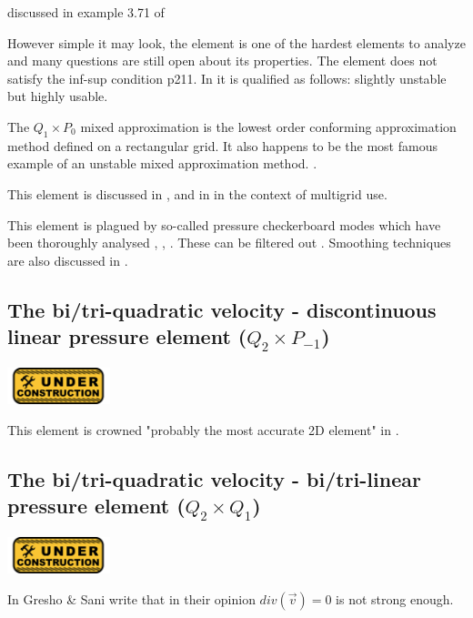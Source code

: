 discussed in example 3.71 of \cite{john16}

However simple it may look, the  element is 
one of the hardest elements to analyze and many questions are still open about its properties. 
The element does not satisfy the inf-sup condition \cite{hugh}p211. 
In \cite{grsa} it is qualified as follows: slightly unstable but highly usable. 

The $Q_1 \times P_0$ mixed approximation is the lowest order conforming approximation 
method defined on a rectangular grid. It also happens to be the most famous example 
of an unstable mixed approximation method.
\cite[p235]{elsw}.

This element is discussed in \cite{fort81}, \cite{fofo85} and in \cite{pisa85} 
in the context of multigrid use.

This element is plagued by so-called pressure checkerboard modes which
have been thoroughly analysed \cite{grsi94}, \cite{chpc95}, \cite{sagl81a,sagl81b}.
These can be filtered out \cite{chpc95}. Smoothing techniques are also discussed in \cite{legs79}.





\subsection{The bi/tri-quadratic velocity - discontinuous linear pressure element ($Q_2 \times P_{-1}$)}
\includegraphics[width=3cm]{images/under_construction}

This element is crowned "probably the most accurate 2D element" in \cite{grsa}.


\subsection{The bi/tri-quadratic velocity - bi/tri-linear pressure element ($Q_2 \times Q_1$)}
\includegraphics[width=3cm]{images/under_construction}

In \cite{grsa} Gresho \& Sani write that in their opinion $div(\vec v)=0$ is not strong enough.

